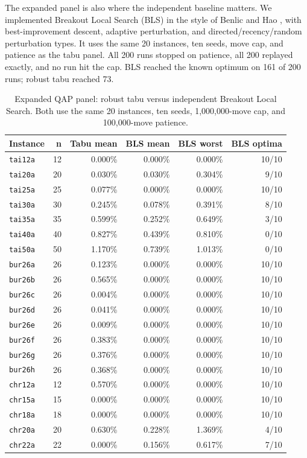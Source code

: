 \documentclass[11pt]{article}
\begin{document}
The expanded panel is also where the independent baseline matters. We implemented Breakout Local
Search (BLS) in the style of Benlic and Hao \citep{benlic2013}, with best-improvement descent,
adaptive perturbation, and directed/recency/random perturbation types. It uses the same 20
instances, ten seeds, move cap, and patience as the tabu panel. All 200 runs stopped on patience,
all 200 replayed exactly, and no run hit the cap. BLS reached the known optimum on 161 of 200 runs;
robust tabu reached 73.

\begin{table}[t]
\centering
\caption{Expanded QAP panel: robust tabu versus independent Breakout Local Search. Both use the
same 20 instances, ten seeds, 1,000,000-move cap, and 100,000-move patience.}
\label{tab:qap-bls}
\small
\begin{tabular}{lrrrrr}
\toprule
Instance & n & Tabu mean & BLS mean & BLS worst & BLS optima \\
\midrule
\texttt{tai12a} & 12 & 0.000\% & 0.000\% & 0.000\% & 10/10 \\
\texttt{tai20a} & 20 & 0.030\% & 0.030\% & 0.304\% & 9/10 \\
\texttt{tai25a} & 25 & 0.077\% & 0.000\% & 0.000\% & 10/10 \\
\texttt{tai30a} & 30 & 0.245\% & 0.078\% & 0.391\% & 8/10 \\
\texttt{tai35a} & 35 & 0.599\% & 0.252\% & 0.649\% & 3/10 \\
\texttt{tai40a} & 40 & 0.827\% & 0.439\% & 0.810\% & 0/10 \\
\texttt{tai50a} & 50 & 1.170\% & 0.739\% & 1.013\% & 0/10 \\
\texttt{bur26a} & 26 & 0.123\% & 0.000\% & 0.000\% & 10/10 \\
\texttt{bur26b} & 26 & 0.565\% & 0.000\% & 0.000\% & 10/10 \\
\texttt{bur26c} & 26 & 0.004\% & 0.000\% & 0.000\% & 10/10 \\
\texttt{bur26d} & 26 & 0.041\% & 0.000\% & 0.000\% & 10/10 \\
\texttt{bur26e} & 26 & 0.009\% & 0.000\% & 0.000\% & 10/10 \\
\texttt{bur26f} & 26 & 0.383\% & 0.000\% & 0.000\% & 10/10 \\
\texttt{bur26g} & 26 & 0.376\% & 0.000\% & 0.000\% & 10/10 \\
\texttt{bur26h} & 26 & 0.368\% & 0.000\% & 0.000\% & 10/10 \\
\texttt{chr12a} & 12 & 0.570\% & 0.000\% & 0.000\% & 10/10 \\
\texttt{chr15a} & 15 & 0.000\% & 0.000\% & 0.000\% & 10/10 \\
\texttt{chr18a} & 18 & 0.000\% & 0.000\% & 0.000\% & 10/10 \\
\texttt{chr20a} & 20 & 0.630\% & 0.228\% & 1.369\% & 4/10 \\
\texttt{chr22a} & 22 & 0.000\% & 0.156\% & 0.617\% & 7/10 \\
\bottomrule
\end{tabular}
\end{table}
\end{document}
